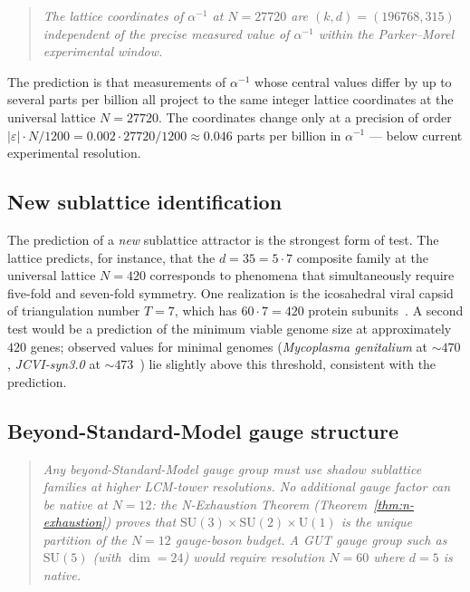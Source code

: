\documentclass[11pt,a4paper]{article}
\theoremstyle{definition}
\theoremstyle{remark}
\newcommand{\eps}{\varepsilon}
\begin{document}
\begin{quote}\itshape
The lattice coordinates of $\alpha^{-1}$ at $N=27720$ are $(k,d)=(196768,315)$ independent of the precise measured value of $\alpha^{-1}$ within the Parker--Morel experimental window.
\end{quote}

The prediction is that measurements of $\alpha^{-1}$ whose central values differ by up to several parts per billion all project to the same integer lattice coordinates at the universal lattice $N=27720$. The coordinates change only at a precision of order $|\eps|\cdot N/1200 = 0.002\cdot 27720/1200 \approx 0.046$ parts per billion in $\alpha^{-1}$ --- below current experimental resolution.

\subsection{New sublattice identification}

The prediction of a \emph{new} sublattice attractor is the strongest form of test. The lattice predicts, for instance, that the $d=35 = 5\cdot 7$ composite family at the universal lattice $N=420$ corresponds to phenomena that simultaneously require five-fold and seven-fold symmetry. One realization is the icosahedral viral capsid of triangulation number $T=7$, which has $60\cdot 7 = 420$ protein subunits~\cite{CasparKlug}. A second test would be a prediction of the minimum viable genome size at approximately $420$ genes; observed values for minimal genomes (\emph{Mycoplasma genitalium} at $\sim 470$, \emph{JCVI-syn3.0} at $\sim 473$~\cite{Hutchison2016}) lie slightly above this threshold, consistent with the prediction.

\subsection{Beyond-Standard-Model gauge structure}\label{subsec:bsm-prediction}

\begin{quote}\itshape
Any beyond-Standard-Model gauge group must use shadow sublattice families at higher LCM-tower resolutions. No additional gauge factor can be native at $N = 12$: the N-Exhaustion Theorem (Theorem~\ref{thm:n-exhaustion}) proves that $\mathrm{SU}(3)\times\mathrm{SU}(2)\times\mathrm{U}(1)$ is the unique partition of the $N = 12$ gauge-boson budget. A GUT gauge group such as $\mathrm{SU}(5)$ (with $\dim = 24$) would require resolution $N = 60$ where $d = 5$ is native.
\end{quote}
\end{document}

